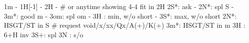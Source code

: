 1m - 1H[-1] - 2H -  # or anytime showing 4-4 fit in 2H
2S*: ask
   - 2N*: spl S
   - 3m*: good m
   - 3om: spl om
   - 3H : min, w/o short
   - 3S*: max, w/o short
2N*: HSGT/ST in S  # request void/x/xx/Qx/A(+)/K(+)
3m*: HSGT/ST in m  
3H : 6+H inv
3S+: spl
3N : s/o